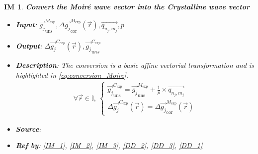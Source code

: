 \documentclass[12pt]{article}
\newtheorem{IM}{IM}
\begin{document}
\begin{IM}
\label{IM_4}
\noindent\colorbox{shadecolorIM}{\normalfont \textbf{Convert the Moir{\'e} wave 
vector into the Crystalline wave vector}}
\normalfont
\begin{itemize}
\item \textbf{Input}: 
$\overrightarrow{g_{j}}_{\text{uns}}^{M_{\text{exp}}},\Delta\overrightarrow{g_{j}}_{\text{cor}}^{M_{\text{exp}}}(\vec{r}),\overrightarrow{q_{n_j,m_j}},p$
\item \textbf{Output}: $\Delta 
\overrightarrow{g_{j}}^{C_{exp}}(\vec{r}),\overrightarrow{g_{j}}_{uns}^{C_{exp}}$
\item \textbf{Description}: The conversion is a basic affine vectorial 
transformation and is highlighted in \cref{eq:conversion_Moire}.
\begin{equation}
\label{eq:conversion_Moire}
\begin{gathered}
\forall \vec{r} \in \mathbb{I}, \ \begin{cases}
\overrightarrow{g_{j}}_{\text{uns}}^{C_{\text{exp}}}= 
\overrightarrow{g_{j}}_{\text{uns}}^{M_{\text{exp}}} + \frac{1}{p} \times 
\overrightarrow{q_{n_j,m_j}} \\
\Delta \overrightarrow{g_{j}}^{C_{\text{exp}}}(\vec{r})= 
\Delta\overrightarrow{g_{j}}_{\text{cor}}^{M_{\text{exp}}}(\vec{r})
\end{cases}
\end{gathered}
\end{equation}
\item \textbf{Source}: \cite{Pofelski2018}
\item \textbf{Ref by}: \cref{IM_1}, \cref{IM_2}, \cref{IM_3}, \cref{DD_2}, 
\cref{DD_3}, \cref{DD_1}
\end{itemize}
\end{IM}
\end{document}
